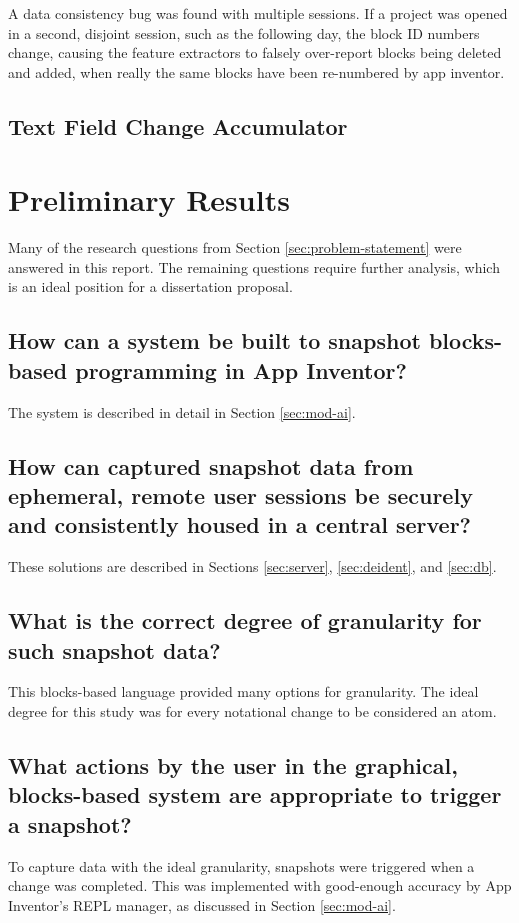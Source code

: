 A data consistency bug was found with multiple sessions. If a project was opened in a second, disjoint session, such as the following day, the block ID numbers change, causing the feature extractors to falsely over-report blocks being deleted and added, when really the same blocks have been re-numbered by app inventor.

\section{Text Field Change Accumulator}
\label{sec:text-acc}

\chapter{Preliminary Results} %


Many of the research questions from Section \ref{sec:problem-statement} were answered in this report. The remaining questions require further analysis, which is an ideal position for a dissertation proposal. 

\section{How can a system be built to snapshot blocks-based programming in App Inventor? }
The system is described in detail in Section \ref{sec:mod-ai}.

\section{How can captured snapshot data from ephemeral, remote user sessions be securely and consistently housed in a central server? }
These solutions are described in Sections \ref{sec:server}, \ref{sec:deident}, and \ref{sec:db}.

\section{What is the correct degree of granularity for such snapshot data?}
This blocks-based language provided many options for granularity. The ideal degree for this study was for every notational change to be considered an atom.

\section{What actions by the user in the graphical, blocks-based system are appropriate to trigger a snapshot?}
To capture data with the ideal granularity, snapshots were triggered when a change was completed. This was implemented with good-enough accuracy by App Inventor's REPL manager, as discussed in Section \ref{sec:mod-ai}.

